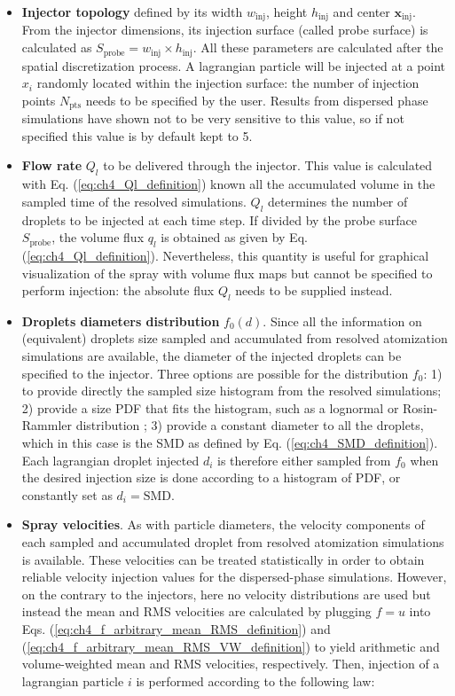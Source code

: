 \begin{itemize}

	\item \textbf{Injector topology} defined by its width $w_\mathrm{inj}$, height $h_\mathrm{inj}$ and center $\textbf{x}_\mathrm{inj}$. From the injector dimensions, its injection surface (called probe surface) is calculated as $S_\mathrm{probe} = w_\mathrm{inj} \times h_\mathrm{inj}$. All these parameters are calculated after the spatial discretization process. A lagrangian particle will be injected at a point $x_i$ randomly located within the injection surface: the number of injection points $N_\mathrm{pts}$ needs to be specified by the user. Results from dispersed phase simulations have shown not to be very sensitive to this value, so if not specified this value is by default kept to 5.
	
	\item \textbf{Flow rate} $Q_l$ to be delivered through the injector. This value is calculated with Eq. (\ref{eq:ch4_Ql_definition}) known all the accumulated volume in the sampled time of the resolved simulations. $Q_l$ determines the number of droplets to be injected at each time step. If divided by the probe surface $S_\mathrm{probe}$, the volume flux $q_l$ is obtained as given by Eq. (\ref{eq:ch4_Ql_definition}). Nevertheless, this quantity is useful for graphical visualization of the spray with volume flux maps but cannot be specified to perform injection: the absolute flux $Q_l$ needs to be supplied instead.
	
	\item \textbf{Droplets diameters distribution} $f_0 \left( d \right)$. Since all the information on (equivalent) droplets size sampled and accumulated from resolved atomization simulations are available, the diameter of the injected droplets can be specified to the injector. Three options are possible for the distribution $f_0$: 1) to provide directly the sampled size histogram from the resolved simulations; 2) provide a size PDF that fits the histogram, such as a lognormal or Rosin-Rammler distribution ; 3) provide a constant diameter to all the droplets, which in this case is the SMD as defined by Eq. (\ref{eq:ch4_SMD_definition}). Each lagrangian droplet injected $d_i$ is therefore either sampled from $f_0$ when the desired injection size is done according to a histogram of PDF, or constantly set as $d_i = \mathrm{SMD}$.
	
	\item \textbf{Spray velocities}. As with particle diameters, the velocity components of each sampled and accumulated droplet from resolved atomization simulations is available. These velocities can be treated statistically in order to obtain reliable velocity injection values for the dispersed-phase simulations. However, on the contrary to the injectors, here no velocity distributions are used but instead the mean and RMS velocities are calculated by plugging $f = u$ into Eqs. (\ref{eq:ch4_f_arbitrary_mean_RMS_definition}) and (\ref{eq:ch4_f_arbitrary_mean_RMS_VW_definition}) to yield arithmetic and volume-weighted mean and RMS velocities, respectively. Then, injection of a lagrangian particle $i$ is performed according to the following law:
	

\end{itemize}
